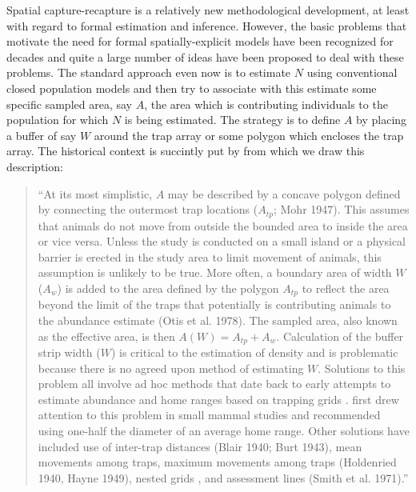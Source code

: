 Spatial capture-recapture is a relatively new methodological
development, at least with regard to formal estimation and
inference. However, the basic problems that motivate the need for
formal spatially-explicit models have been recognized for decades and
quite a large number of ideas have been proposed to deal with these
problems. The standard approach even now is to estimate $N$ using
conventional closed population models \citep{otis_etal:1978} and then
try to associate with this estimate some specific sampled area, say $A$,
the area which is contributing individuals to the population for which
$N$ is being estimated. The strategy is to define $A$ by placing a buffer
of say $W$ around the trap array or some polygon which encloses the trap
array. The historical context is succintly put by \citep{obrien:2011}
from which we draw this description:

\begin{quote}
  ``At its most simplistic, $A$ may be described by a concave polygon
  defined by connecting the outermost trap locations ($A_{tp}$; Mohr
  1947). This assumes that animals do not move from outside the
  bounded area to inside the area or vice versa. Unless the study is
  conducted on a small island or a physical barrier is erected in the
  study area to limit movement of animals, this assumption is unlikely
  to be true. More often, a boundary area of width $W$ ($A_{w}$) is added to
  the area defined by the polygon $A_{tp}$ to reflect the area beyond the
  limit of the traps that potentially is contributing animals to the
  abundance estimate (Otis et al. 1978). The sampled area, also known
  as the effective area, is then $A(W) = A_{tp} + A_{w}$. Calculation of the
  buffer strip width ($W$) is critical to the estimation of density and
  is problematic because there is no agreed upon method of estimating
  $W$. Solutions to this problem all involve ad hoc methods that date
  back to early attempts to estimate abundance and home ranges based
  on trapping grids 
  \citep[see][]{hayne:1949}. \citet{dice:1938} first drew attention
  to this problem in small mammal studies and recommended using
  one-half the diameter of an average home range. Other solutions have
  included use of inter-trap distances (Blair 1940; Burt 1943), mean
  movements among traps, maximum movements among traps (Holdenried
  1940, Hayne 1949), nested grids \citep{otis_etal:1978}, and assessment
  lines (Smith et al. 1971).''
\end{quote}

